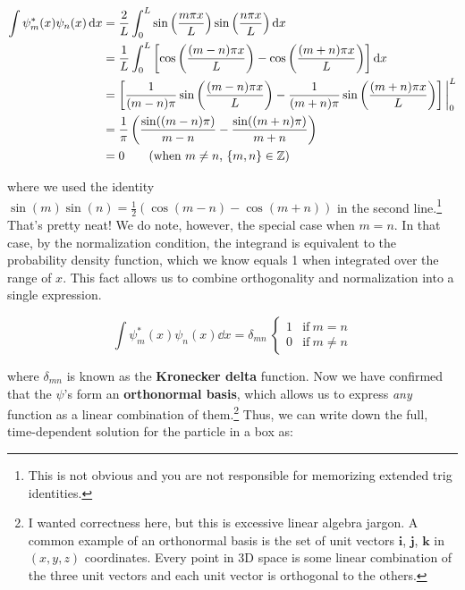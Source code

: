 \begin{align*}
	\int \psi_m^*(x) \psi_n(x) \dd{x} &= \frac{2}{L} \int_0^L \sin\left(\frac{m\pi x}{L}\right) \sin\left(\frac{n\pi x}{L} \right) \dd{x} \\
	&= \frac{1}{L} \int_{0}^{L} \left[ \cos\left(\frac{(m-n)\pi x}{L}\right) - \cos\left(\frac{(m+n)\pi x}{L}\right) \right] \dd{x} \\
	&= \left[ \frac{1}{(m-n)\pi} \sin \left(\frac{(m-n)\pi x}{L}\right) - \frac{1}{(m+n)\pi} \sin\left( \frac{(m+n)\pi x}{L} \right)\right] \bigg|_0^L \\
	&= \frac{1}{\pi} \left( \frac{\sin((m-n)\pi)}{m-n} - \frac{\sin((m+n)\pi)}{m+n}\right) \\
	&= 0 \tag{when $m\neq n$, $\{m,n\} \in \mathbb{Z}$}
\end{align*}

\noindent where we used the identity $\sin(m)\sin(n) = \frac{1}{2}(\cos(m - n) - \cos(m + n))$ in the second line.\footnote{This is not obvious and you are not responsible for memorizing extended trig identities.}
That's pretty neat! 
We do note, however, the special case when $m=n$. 
In that case, by the normalization condition, the integrand is equivalent to the probability density function, which we know equals 1 when integrated over the range of $x$. 
This fact allows us to combine orthogonality and normalization into a single expression.

\begin{tcolorbox}[title = Orthonormal stationary states] \vspace{-2ex}
	\begin{equation}
		\int \psi_m^*(x) \psi_n(x) \dd{x} = \delta_{mn}\ \begin{cases}
		1 & \text{if}\ m=n \\
		0 & \text{if}\ m\neq n
		\end{cases} \label{eq:orthonorm}
	\end{equation}
\end{tcolorbox}

\noindent where $\delta_{mn}$ is known as the \textbf{Kronecker delta} function. 
Now we have confirmed that the $\psi$'s form an \textbf{orthonormal basis}, which allows us to express \emph{any} function as a linear combination of them.\footnote{I wanted correctness here, but this is excessive linear algebra jargon. A common example of an orthonormal basis is the set of unit vectors $\mathbf{i}$, $\mathbf{j}$, $\mathbf{k}$ in $(x,y,z)$ coordinates. Every point in 3D space is some linear combination of the three unit vectors and each unit vector is orthogonal to the others.} 
Thus, we can write down the full, time-dependent solution for the particle in a box as:

